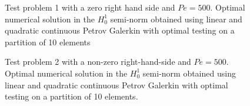 \begin{figure}
	\centering
	\caption{Test problem 1 with a zero right hand side and $Pe =500$. Optimal numerical solution in the $H^1_0$ semi-norm obtained using linear and quadratic continuous Petrov Galerkin with optimal testing  on a partition of 10 elements}
	\label{fig:optimaltestfunc4}
\end{figure}

\begin{figure}
	\centering
	\caption{Test problem 2 with a non-zero right-hand-side and $Pe=500$. Optimal numerical solution in the $H^1_0$ semi-norm obtained using linear and quadratic continuous Petrov Galerkin with optimal testing  on a partition of 10 elements.}
	\label{fig:optimaltestfunc5}
\end{figure}


